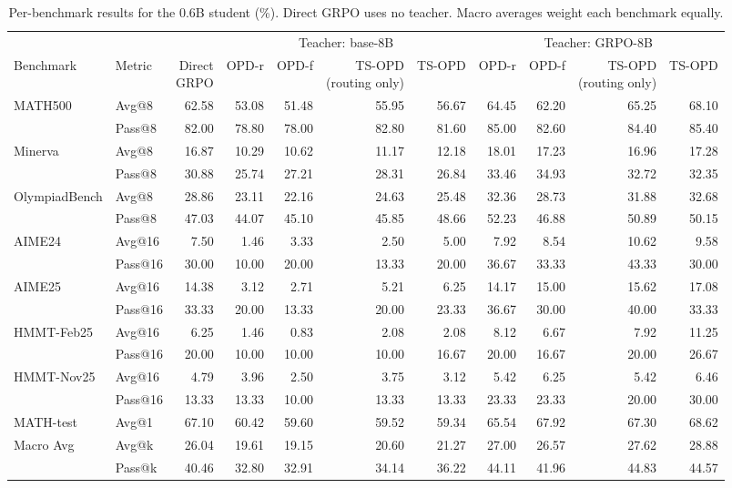 \begin{table}[h]
\centering
\scriptsize
\setlength{\tabcolsep}{3.5pt}
\caption{Per-benchmark results for the 0.6B student (\%). Direct GRPO uses no teacher. Macro averages weight each benchmark equally.}
\label{tab:app-full-06B}
\begin{tabular}{llrrrrrrrrr}
\toprule
 & & & \multicolumn{4}{c}{Teacher: base-8B} & \multicolumn{4}{c}{Teacher: GRPO-8B} \\
\cmidrule(lr){4-7}\cmidrule(lr){8-11}
Benchmark & Metric & \shortstack{Direct\\GRPO} & OPD-r & OPD-f & \shortstack{TS-OPD\\(routing only)} & TS-OPD & OPD-r & OPD-f & \shortstack{TS-OPD\\(routing only)} & TS-OPD \\
\midrule
MATH500 & Avg@8 & 62.58 & 53.08 & 51.48 & 55.95 & 56.67 & 64.45 & 62.20 & 65.25 & 68.10 \\
 & Pass@8 & 82.00 & 78.80 & 78.00 & 82.80 & 81.60 & 85.00 & 82.60 & 84.40 & 85.40 \\
Minerva & Avg@8 & 16.87 & 10.29 & 10.62 & 11.17 & 12.18 & 18.01 & 17.23 & 16.96 & 17.28 \\
 & Pass@8 & 30.88 & 25.74 & 27.21 & 28.31 & 26.84 & 33.46 & 34.93 & 32.72 & 32.35 \\
OlympiadBench & Avg@8 & 28.86 & 23.11 & 22.16 & 24.63 & 25.48 & 32.36 & 28.73 & 31.88 & 32.68 \\
 & Pass@8 & 47.03 & 44.07 & 45.10 & 45.85 & 48.66 & 52.23 & 46.88 & 50.89 & 50.15 \\
AIME24 & Avg@16 & 7.50 & 1.46 & 3.33 & 2.50 & 5.00 & 7.92 & 8.54 & 10.62 & 9.58 \\
 & Pass@16 & 30.00 & 10.00 & 20.00 & 13.33 & 20.00 & 36.67 & 33.33 & 43.33 & 30.00 \\
AIME25 & Avg@16 & 14.38 & 3.12 & 2.71 & 5.21 & 6.25 & 14.17 & 15.00 & 15.62 & 17.08 \\
 & Pass@16 & 33.33 & 20.00 & 13.33 & 20.00 & 23.33 & 36.67 & 30.00 & 40.00 & 33.33 \\
HMMT-Feb25 & Avg@16 & 6.25 & 1.46 & 0.83 & 2.08 & 2.08 & 8.12 & 6.67 & 7.92 & 11.25 \\
 & Pass@16 & 20.00 & 10.00 & 10.00 & 10.00 & 16.67 & 20.00 & 16.67 & 20.00 & 26.67 \\
HMMT-Nov25 & Avg@16 & 4.79 & 3.96 & 2.50 & 3.75 & 3.12 & 5.42 & 6.25 & 5.42 & 6.46 \\
 & Pass@16 & 13.33 & 13.33 & 10.00 & 13.33 & 13.33 & 23.33 & 23.33 & 20.00 & 30.00 \\
MATH-test & Avg@1 & 67.10 & 60.42 & 59.60 & 59.52 & 59.34 & 65.54 & 67.92 & 67.30 & 68.62 \\
\midrule
Macro Avg & Avg@k & 26.04 & 19.61 & 19.15 & 20.60 & 21.27 & 27.00 & 26.57 & 27.62 & 28.88 \\
 & Pass@k & 40.46 & 32.80 & 32.91 & 34.14 & 36.22 & 44.11 & 41.96 & 44.83 & 44.57 \\
\bottomrule
\end{tabular}
\end{table}
